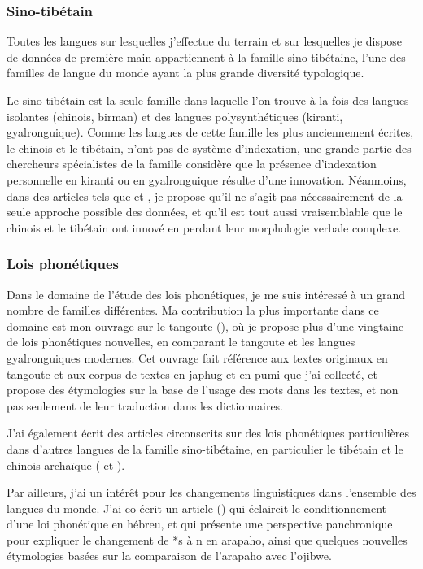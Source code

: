 \documentclass[oldfontcommands,oneside,a4paper,11pt]{article}
\begin{document}
\subsubsection{Sino-tibétain}
Toutes les langues sur lesquelles j'effectue du terrain et sur lesquelles je dispose de données de première main appartiennent à la famille sino-tibétaine,  l'une des familles de langue du monde ayant la plus grande diversité typologique.

Le sino-tibétain est la seule famille dans laquelle l'on trouve à la fois des langues isolantes (chinois, birman) et des langues polysynthétiques (kiranti, gyalronguique). Comme les langues de cette famille les plus anciennement écrites, le chinois et le tibétain, n'ont pas de système d'indexation, une grande partie des chercheurs spécialistes de la famille considère que la présence d'indexation personnelle en kiranti ou en gyalronguique résulte d'une innovation. Néanmoins, dans des articles tels que \citet{jacques12agreement} et \citet{jacques12internal}, je propose qu'il ne s'agit pas nécessairement de la seule approche possible des données, et qu'il est tout aussi vraisemblable que le chinois et le tibétain ont innové en perdant leur morphologie verbale complexe.


\subsubsection{Lois phonétiques}
Dans le domaine de l'étude des lois phonétiques, je me suis intéressé à un grand nombre de familles différentes. Ma contribution la plus importante dans ce domaine est mon ouvrage sur le tangoute (\citealt{jacques14esquisse}), où je propose plus d'une vingtaine de lois phonétiques nouvelles, en comparant le tangoute et les langues gyalronguiques modernes. Cet ouvrage fait référence aux textes originaux en tangoute et aux corpus de textes en japhug et en pumi que j'ai collecté, et propose des étymologies sur la base de l'usage des mots dans les textes, et non pas seulement de leur traduction dans les dictionnaires. 

J'ai également écrit des articles circonscrits sur des lois phonétiques particulières dans d'autres langues de la famille sino-tibétaine, en particulier le tibétain et le chinois archaïque (\citealt{jacques15sr} et \citealt{jacques13yod}).

Par ailleurs, j'ai un intérêt pour les changements linguistiques dans l'ensemble des langues du monde. J'ai co-écrit un article (\citealt{rg-gj12yod}) qui éclaircit le conditionnement d'une loi phonétique en hébreu, et \citet{jacques13arapaho} qui présente une perspective panchronique pour expliquer le changement de *s à n en arapaho, ainsi que quelques nouvelles étymologies basées sur la comparaison de l'arapaho avec l'ojibwe.
\end{document}
